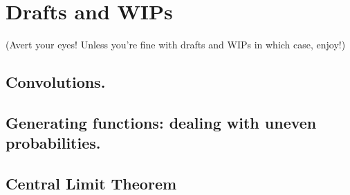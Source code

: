 \documentclass[../main/main.tex]{subfiles}
\begin{document}
\chapter{Drafts and WIPs}\label{drafts-and-wips}

(Avert your eyes! Unless you're fine with drafts and WIPs \textemdash{} in which case, enjoy!)



\section{Convolutions.}

\section{Generating functions: dealing with uneven probabilities.}\label{sec:generating-functions} %














\section{Central Limit Theorem} %



\end{document}
